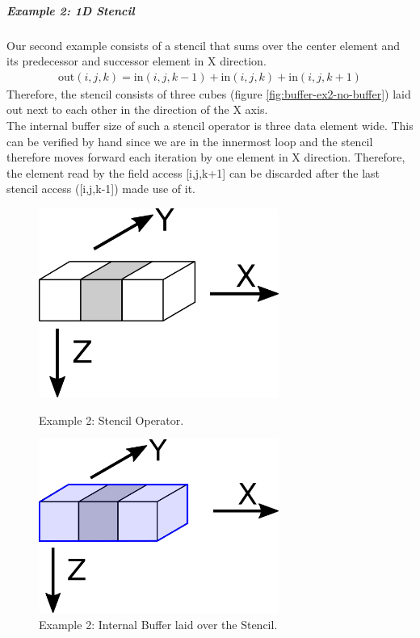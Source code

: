 \subparagraph{Example 2: 1D Stencil}
Our second example consists of a stencil that sums over the center element and its predecessor and successor element in X direction. 
\begin{align}
\text{out}(i, j, k) = \text{in}(i, j, k-1) + \text{in}(i, j, k) + \text{in}(i, j, k+1)
\end{align}
Therefore, the stencil consists of three cubes (figure \ref{fig:buffer-ex2-no-buffer}) laid out next to each other in the direction of the X axis.\\
The internal buffer size of such a stencil operator is three data element wide. This can be verified by hand since we are in the innermost loop and the stencil therefore moves forward each iteration by one element in X direction. Therefore, the element read by the field access [i,j,k+1] can be discarded after the last stencil access ([i,j,k-1]) made use of it. 
\begin{figure}[h]
	\begin{minipage}{.5\columnwidth}
		\centering
		\includegraphics[width=0.7\textwidth]{drawings/buffer-ex2-no-buffer.png}
		\caption{Example 2: Stencil Operator.}
		\label{fig:buffer-ex2-no-buffer}
	\end{minipage}
	\begin{minipage}{.5\columnwidth}
		\centering
		\includegraphics[width=0.7\textwidth]{drawings/buffer-ex2-buffer.png}
		\caption{Example 2: Internal Buffer laid over the Stencil.}
		\label{fig:buffer-ex2-buffer}
	\end{minipage}
\end{figure}



